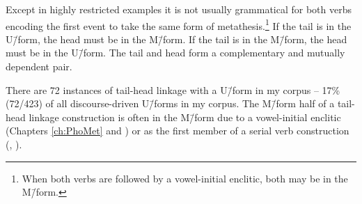 Except in highly restricted examples it is not
usually grammatical for both verbs encoding the first
event to take the same form of metathesis.\footnote{
		When both verbs are followed by a vowel-initial enclitic, both may be in the M\=/form.}
If the tail is in the U\=/form, the head must be in the \mbox{M\=/form}.
If the tail is in the M\=/form, the head must be in the U\=/form.
The tail and head form a complementary and mutually dependent pair.

There are 72 instances of tail-head linkage with a U\=/form in my corpus
-- 17{\%} (72/423) of all discourse-driven U\=/forms in my corpus.
The M\=/form half of a tail-head
linkage construction is often in the M\=/form due to
a vowel-initial enclitic (Chapters \ref{ch:PhoMet} and )
or as the first member of a serial verb construction (, ).